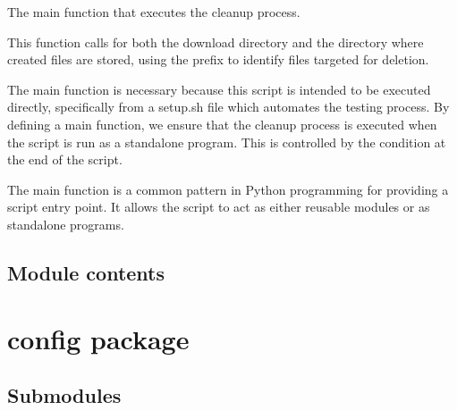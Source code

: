 \documentclass[letterpaper,10pt,english]{sphinxmanual}
\begin{document}

\begin{fulllineitems}
\label{\detokenize{cleanup:cleanup.delete_test_files.main}}
\pysigstartsignatures
{}
\pysigstopsignatures
\sphinxAtStartPar
The main function that executes the cleanup process.

\sphinxAtStartPar
This function calls  for both the download directory and the directory
where created files are stored, using the prefix  to identify files targeted for deletion.

\sphinxAtStartPar
The main function is necessary because this script is intended to be executed directly, 
specifically from a setup.sh file which automates the testing process. By defining a main function, 
we ensure that the cleanup process is executed when the script is run as a standalone program. 
This is controlled by the  condition at the end of the script.

\sphinxAtStartPar
The main function is a common pattern in Python programming for providing a script entry point. 
It allows the script to act as either reusable modules or as standalone programs.

\end{fulllineitems}



\subsection{Module contents}
\label{\detokenize{cleanup:module-cleanup}}\label{\detokenize{cleanup:module-contents}}
\sphinxstepscope


\section{config package}
\label{\detokenize{config:config-package}}\label{\detokenize{config::doc}}

\subsection{Submodules}
\label{\detokenize{config:submodules}}
\end{document}
